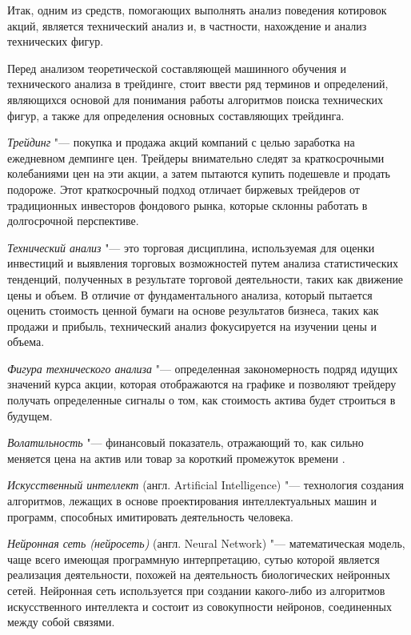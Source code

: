 \documentclass[bachelor, och, coursework]{SCWorks}
\begin{document}
    Итак, одним из средств, помогающих выполнять анализ поведения котировок
    акций, является технический анализ и, в частности, нахождение и анализ
    технических фигур.

    Перед анализом теоретической составляющей машинного обучения и технического
    анализа в трейдинге, стоит ввести ряд терминов и определений, являющихся
    основой для понимания работы алгоритмов поиска технических фигур, а также
    для определения основных составляющих трейдинга.

    \textit{Трейдинг} "--- покупка и продажа акций компаний с целью заработка на
    ежедневном демпинге цен. Трейдеры внимательно следят за краткосрочными
    колебаниями цен на эти акции, а затем пытаются купить подешевле и продать
    подороже. Этот краткосрочный подход отличает биржевых трейдеров от
    традиционных инвесторов фондового рынка, которые склонны работать в
    долгосрочной перспективе.

    \textit{Технический анализ} "--- это торговая дисциплина, используемая для
    оценки инвестиций и выявления торговых возможностей путем анализа
    статистических тенденций, полученных в результате торговой деятельности,
    таких как движение цены и объем. В отличие от фундаментального анализа,
    который пытается оценить стоимость ценной бумаги на основе результатов
    бизнеса, таких как продажи и прибыль, технический анализ фокусируется на
    изучении цены и объема.

    \textit{Фигура технического анализа} "--- определенная закономерность подряд
    идущих значений курса акции, которая отображаются на графике и позволяют
    трейдеру получать определенные сигналы о том, как стоимость актива будет
    строиться в будущем.

    \textit{Волатильность} "--- финансовый показатель, отражающий то, как сильно
    меняется цена на актив или товар за короткий промежуток времени \cite{OPCIONS}.

    \textit{Искусственный интеллект} (англ. Artificial Intelligence) "---
    технология создания алгоритмов, лежащих в основе проектирования
    интеллектуальных машин и программ, способных имитировать деятельность
    человека.

    \textit{Нейронная сеть (нейросеть)} (англ. Neural Network) "---
    математическая модель, чаще всего имеющая программную интерпретацию, сутью
    которой является реализация деятельности, похожей на деятельность
    биологических нейронных сетей. Нейронная сеть используется при создании
    какого-либо из алгоритмов искусственного интеллекта и состоит из
    совокупности нейронов, соединенных между собой связями. 
\end{document}
